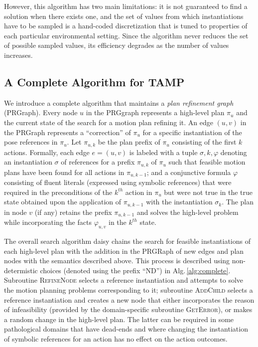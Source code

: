However, this algorithm has two
main limitations: it is not guaranteed to find a solution when
there exists one, and the set of values from which instantiations
have to be sampled is a hand-coded discretization that is tuned
to properties of each particular environmental setting. Since the algorithm
never reduces the set of possible sampled values, its
efficiency degrades as the number of values increases.

\subsection{A Complete Algorithm for TAMP}
We introduce a complete algorithm that maintains a \emph{plan
  refinement graph} (PRGraph). Every node $u$ in the PRGgraph
represents a high-level plan $\pi_u$ and the current state of the search
for a motion plan refining it. An edge $(u,v)$ in the PRGraph
represents a ``correction'' of $\pi_u$ for a specific instantiation of
the pose references in $\pi_u$. Let $\pi_{u,k}$ be the plan prefix of
$\pi_u$ consisting of the first $k$ actions. Formally, each edge
$e=(u,v)$ is labeled with a tuple $ \sigma, k, \varphi$ denoting an
instantiation $\sigma$ of references for a prefix $\pi_{u,k}$ of
$\pi_u$ such that feasible motion plans have been found for all
actions in $\pi_{u,k-1}$; and a conjunctive formula $\varphi$
consisting of fluent literals (expressed using symbolic references)
that were required in the preconditions of the $k^{th}$ action in
$\pi_u$ but were not true in the true state obtained upon the
application of $\pi_{u,k-1}$ with the instantiation $\sigma_k$.  The
plan in node $v$ (if any) retains the prefix $\pi_{u,k-1}$ and solves
the high-level problem while incorporating the facts $\varphi_{u,v}$
in the $k^{th}$ state.

The overall search algorithm daisy chains the search for feasible
instantiations of each high-level plan with the addition in the
PRGRaph of new edges and plan nodes with the semantics described
above. This process is described using non-determistic choices
(denoted using the prefix ``ND'') in
Alg.\,\ref{alg:complete}. Subroutine \textsc{RefineNode} selects a
reference instantiation and attempts to solve the motion planning
problems corresponding to it; subroutine \textsc{AddChild} selects a
reference instantiation and creates a new node that either
incorporates the reason of infeasibility (provided by the
domain-specific subroutine \textsc{GetError}), or makes a random
change in the high-level plan. The latter can be required in some
pathological domains that have dead-ends and where changing the
instantiation of symbolic references for an action has no effect on the
action outcomes.

